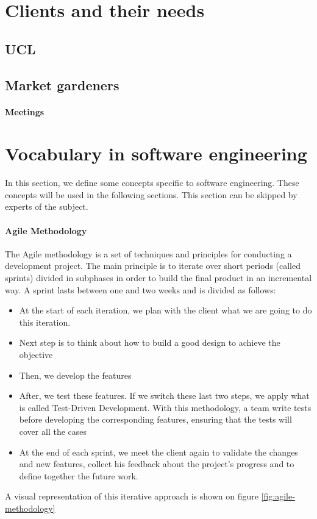 

\section{Clients and their needs}
\subsection{UCL}
\subsection{Market gardeners}
\paragraph{Meetings}

\section{Vocabulary in software engineering}
In this section, we define some concepts specific to software engineering. These concepts will be used in the following sections. This section can be skipped by experts of the subject.
\paragraph{Agile Methodology}
The Agile methodology is a set of techniques and principles for conducting a development project. The main principle is to iterate over short periods (called sprints) divided in subphases in order to build the final product in an incremental way.
A sprint lasts between one and two weeks and is divided as follows: 
\begin{itemize}
    \item At the start of each iteration, we plan with the client what we are going to do this iteration.
    \item Next step is to think about how to build a good design to achieve the objective
    \item Then, we develop the features
    \item After, we test these features. If we switch these last two steps, we apply what is called Test-Driven Development. With this methodology, a team write tests before developing the corresponding features, ensuring that the tests will cover all the cases
    \item At the end of each sprint, we meet the client again to validate the changes and new features, collect his feedback about the project's progress and to define together the future work.
\end{itemize}
A visual representation of this iterative approach is shown on figure \ref{fig:agile-methodology}


